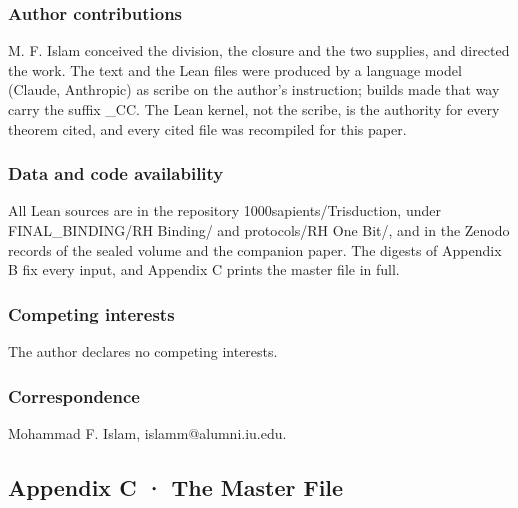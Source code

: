 \documentclass[10pt]{article}
\newcommand{\closingstart}{\par\vspace{12pt}\noindent{\color{accent}\rule{\textwidth}{0.4pt}}\par\begingroup\small\setlength{\parindent}{0pt}\setlength{\parskip}{2pt}}
\newcommand{\closingstop}{\par\endgroup}
\begin{document}
\closingstart

\hypertarget{author-contributions}{%
\subsubsection{Author contributions}\label{author-contributions}}

M. F. Islam conceived the division, the closure and the two supplies,
and directed the work. The text and the Lean files were produced by a
language model (Claude, Anthropic) as scribe on the author's
instruction; builds made that way carry the suffix \_CC. The Lean
kernel, not the scribe, is the authority for every theorem cited, and
every cited file was recompiled for this paper.

\hypertarget{data-and-code-availability}{%
\subsubsection{Data and code
availability}\label{data-and-code-availability}}

All Lean sources are in the repository 1000sapients/Trisduction, under
FINAL\_BINDING/RH Binding/ and protocols/RH One Bit/, and in the Zenodo
records of the sealed volume and the companion paper. The digests of
Appendix B fix every input, and Appendix C prints the master file in
full.

\hypertarget{competing-interests}{%
\subsubsection{Competing interests}\label{competing-interests}}

The author declares no competing interests.

\hypertarget{correspondence}{%
\subsubsection{Correspondence}\label{correspondence}}

Mohammad F. Islam, islamm@alumni.iu.edu.

\closingstop

\hypertarget{appendix-c-the-master-file}{%
\subsection{Appendix C · The Master
File}\label{appendix-c-the-master-file}}
\end{document}
